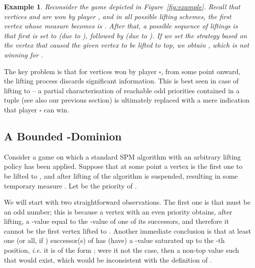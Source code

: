 \documentclass{eptcs}
\newtheorem{exam}{Example}
\newenvironment{example}{\begin{exam} \rm }{\end{exam}}
\newcommand{\odd}{\ensuremath{\square}\xspace}
\newcommand{\ie}{\emph{i.e.}\xspace}
\begin{document}
\begin{example} \label{ex:greedytop_wrong} Reconsider the game
depicted in Figure~\ref{fig:example}. Recall that 
vertices  and  are won by player , and in all
possible lifting schemes, the first vertex whose measure becomes
 is . After that, a possible sequence of liftings is
that first  is set to  (due to ), followed
by  (due to ). If we set the strategy
based on the vertex that caused the given vertex to be lifted to top,
we obtain , which is not winning for
.

\end{example}
The key problem is that for vertices won by player \odd, from some
point onward, the lifting process discards significant information.
This is best seen in case of lifting to  -- a partial
characterisation of reachable odd priorities contained in a tuple
(see also our previous section) is ultimately replaced with a mere
indication that player \odd can win.


\subsection{A Bounded -Dominion}

Consider a game  on which a standard SPM algorithm with an arbitrary lifting policy has been applied. Suppose that at some point a vertex  is the first one to be lifted to , and after lifting of  the algorithm is suspended, resulting in some temporary measure . Let  be the priority of . 

We will start with two straightforward observations. The first one
is that  must be an odd number; this is because a vertex with an
even priority obtains, after lifting, a -value equal to the
-value of one of its successors, and therefore it cannot be
the first vertex lifted to . Another immediate conclusion is
that at least one (or all, if ) successor(s) of
 has (have)  a -value saturated up to the -th position,
\ie it is of the form ;
were it not the case, then a non-top value  such that  would exist, which would be inconsistent with the definition of
\progname.
\end{document}
